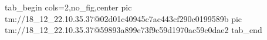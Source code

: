  
 
 
 
 

\qqSecOrig


\ifcmt
  tab_begin cols=2,no_fig,center
    pic tm://18_12_22.10.35.37@02d01c40945c7ac443cf290c0199589b
    pic tm://18_12_22.10.35.37@59893a899e73f9c59d1970ac59c0dae2
  tab_end
\fi


